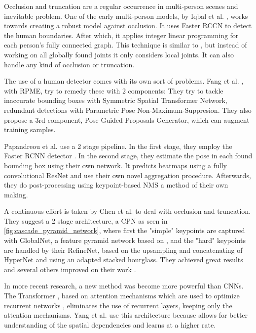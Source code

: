 Occlusion and truncation are a regular occurrence in multi-person scenes and inevitable problem.
One of the early multi-person models, by Iqbal et al. \cite{Iqbal2016}, works towards creating a robust model against occlusion.
It uses Faster RCCN \cite{Ren2015} to detect the human boundaries.
After which, it applies integer linear programming for each person's fully connected graph.
This technique is similar to \cite{Pishchulin2015}, but instead of working on all globally found joints it only considers local joints.
It can also handle any kind of occlusion or truncation.

The use of a human detector comes with its own sort of problems.
Fang et al. \cite{Fang2016}, with \gls{RPME}, try to remedy these with 2 components:
They try to tackle inaccurate bounding boxes with Symmetric Spatial Transformer Network, redundant detections with Parametric Pose Non-Maximum-Suppresion.
They also propose a 3rd component, Pose-Guided Proposals Generator, which can augment training samples.

Papandreou et al. \cite{Papandreou2017} use a 2 stage pipeline.
In the first stage, they employ the Faster RCNN detector \cite{Ren2015}.
In the second stage, they estimate the pose in each found bounding box using their own network.
It predicts heatmaps using a fully convolutional \gls{ResNet} and use their own novel aggregation procedure.
Afterwards, they do post-processing using keypoint-based \gls{NMS} a method of their own making.

A continuous effort is taken by Chen et al. \cite{Chen2017} to deal with occlusion and truncation.
They suggest a 2 stage architecture, a \gls{CPN} as seen in \ref{fig:cascade_pyramid_network},
where first the "simple" keypoints are captured with GlobalNet, a feature pyramid network based on \cite{Lin2016},
and the "hard" keypoints are handled by their RefineNet, based on the upsampling and concatenating of HyperNet \cite{Kong2016} and using an adapted stacked hourglass.
They achieved great results and several others improved on their work \cite{Su2019}\cite{Li2019}.

In more recent research, a new method was become more powerful than \glspl{CNN}.
The Transformer \cite{Vaswani2017}, based on attention mechanisms which are used to optimize recurrent networks \cite{Kim2017}, eliminates the use of recurrent layers, keeping only the attention mechanisms.
Yang et al. \cite{Yang2020} use this architecture because allows for better understanding of the spatial dependencies and learns at a higher rate.

